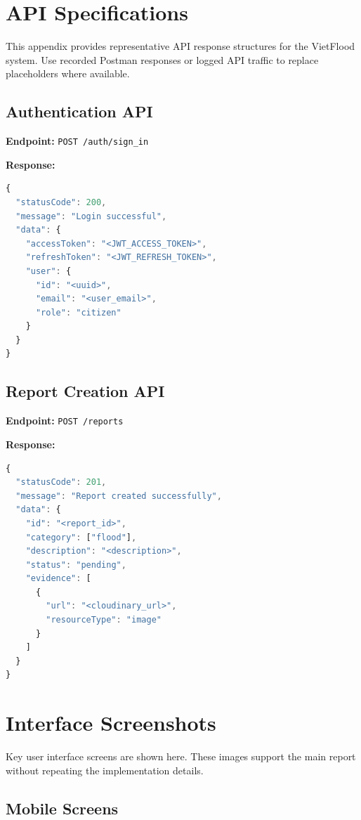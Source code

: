 
\chapter{API Specifications}

This appendix provides representative API response structures for the VietFlood system. Use recorded Postman responses or logged API traffic to replace placeholders where available.

\section{Authentication API}

\textbf{Endpoint:} \texttt{POST /auth/sign\_in}

\textbf{Response:}
\begin{lstlisting}[language=JavaScript, caption=Sign In Response, label=lst:signin-response]
{
  "statusCode": 200,
  "message": "Login successful",
  "data": {
    "accessToken": "<JWT_ACCESS_TOKEN>",
    "refreshToken": "<JWT_REFRESH_TOKEN>",
    "user": {
      "id": "<uuid>",
      "email": "<user_email>",
      "role": "citizen"
    }
  }
}
\end{lstlisting}

\section{Report Creation API}

\textbf{Endpoint:} \texttt{POST /reports}

\textbf{Response:}
\begin{lstlisting}[language=JavaScript, caption=Create Report Response, label=lst:create-report-response]
{
  "statusCode": 201,
  "message": "Report created successfully",
  "data": {
    "id": "<report_id>",
    "category": ["flood"],
    "description": "<description>",
    "status": "pending",
    "evidence": [
      {
        "url": "<cloudinary_url>",
        "resourceType": "image"
      }
    ]
  }
}
\end{lstlisting}

\chapter{Interface Screenshots}

Key user interface screens are shown here. These images support the main report without repeating the implementation details.

\FloatBarrier
\section{Mobile Screens}

